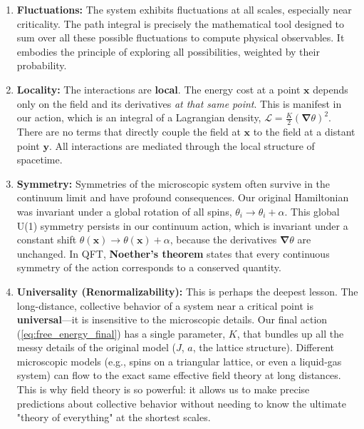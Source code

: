 \documentclass[11pt, a4paper, article]{article}
\renewcommand{\vec}[1]{\bm{#1}} %
\begin{document}
\begin{enumerate}
    \item \textbf{Fluctuations:} The system exhibits fluctuations at all scales, especially near criticality. The path integral is precisely the mathematical tool designed to sum over all these possible fluctuations to compute physical observables. It embodies the principle of exploring all possibilities, weighted by their probability.

    \item \textbf{Locality:} The interactions are \textbf{local}. The energy cost at a point $\vec{x}$ depends only on the field and its derivatives \textit{at that same point}. This is manifest in our action, which is an integral of a Lagrangian density, $\mathcal{L} = \frac{K}{2} (\vec{\nabla}\theta)^2$. There are no terms that directly couple the field at $\vec{x}$ to the field at a distant point $\vec{y}$. All interactions are mediated through the local structure of spacetime.

    \item \textbf{Symmetry:} Symmetries of the microscopic system often survive in the continuum limit and have profound consequences. Our original Hamiltonian was invariant under a global rotation of all spins, $\theta_i \to \theta_i + \alpha$. This global U(1) symmetry persists in our continuum action, which is invariant under a constant shift $\theta(\vec{x}) \to \theta(\vec{x}) + \alpha$, because the derivatives $\vec{\nabla}\theta$ are unchanged. In QFT, \textbf{Noether's theorem} states that every continuous symmetry of the action corresponds to a conserved quantity.

    \item \textbf{Universality (Renormalizability):} This is perhaps the deepest lesson. The long-distance, collective behavior of a system near a critical point is \textbf{universal}—it is insensitive to the microscopic details. Our final action (\ref{eq:free_energy_final}) has a single parameter, $K$, that bundles up all the messy details of the original model ($J$, $a$, the lattice structure). Different microscopic models (e.g., spins on a triangular lattice, or even a liquid-gas system) can flow to the exact same effective field theory at long distances. This is why field theory is so powerful: it allows us to make precise predictions about collective behavior without needing to know the ultimate "theory of everything" at the shortest scales.
\end{enumerate}

\newpage
\end{document}

